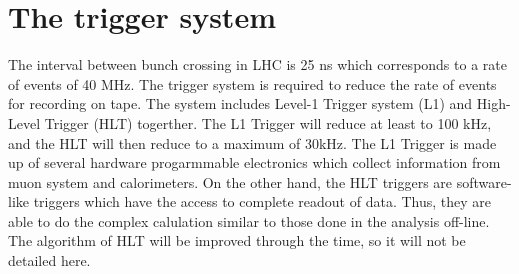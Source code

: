 \section{The trigger system}
The interval between bunch crossing in LHC is 25 ns which corresponds to a rate of events of 40 MHz.
The trigger system is required to reduce the rate of events for recording on tape.
The system includes Level-1 Trigger system (L1) and High-Level Trigger (HLT) togerther.
The L1 Trigger will reduce at least to 100 kHz, and the HLT will then reduce to a maximum of 30kHz.
The L1 Trigger is made up of several hardware progarmmable electronics which collect information from muon system and calorimeters.
On the other hand, the HLT triggers are software-like triggers which have the access to complete readout of data. 
Thus, they are able to do the complex calulation similar to those done in the analysis off-line. 
The algorithm of HLT will be improved through the time, so it will not be detailed here.
 